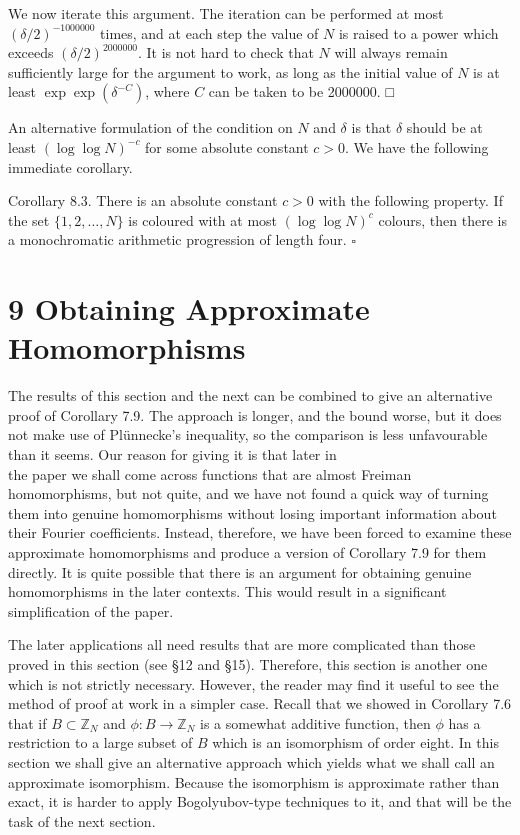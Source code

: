 \documentclass[10pt]{article}
\begin{document}
We now iterate this argument. The iteration can be performed at most $(\delta / 2)^{-1000000}$ times, and at each step the value of $N$ is raised to a power which exceeds $(\delta / 2)^{2000000}$. It is not hard to check that $N$ will always remain sufficiently large for the argument to work, as long as the initial value of $N$ is at least $\exp \exp \left(\delta^{-C}\right)$, where $C$ can be taken to be 2000000. □

An alternative formulation of the condition on $N$ and $\delta$ is that $\delta$ should be at least $(\log \log N)^{-c}$ for some absolute constant $c>0$. We have the following immediate corollary.

Corollary 8.3. There is an absolute constant $c>0$ with the following property. If the set $\{1,2, \ldots, N\}$ is coloured with at most $(\log \log N)^{c}$ colours, then there is a monochromatic arithmetic progression of length four. \(\square\)

\section*{9 Obtaining Approximate Homomorphisms}
The results of this section and the next can be combined to give an alternative proof of Corollary 7.9. The approach is longer, and the bound worse, but it does not make use of Plünnecke's inequality, so the comparison is less unfavourable than it seems. Our reason for giving it is that later in\\
the paper we shall come across functions that are almost Freiman homomorphisms, but not quite, and we have not found a quick way of turning them into genuine homomorphisms without losing important information about their Fourier coefficients. Instead, therefore, we have been forced to examine these approximate homomorphisms and produce a version of Corollary 7.9 for them directly. It is quite possible that there is an argument for obtaining genuine homomorphisms in the later contexts. This would result in a significant simplification of the paper.

The later applications all need results that are more complicated than those proved in this section (see §12 and §15). Therefore, this section is another one which is not strictly necessary. However, the reader may find it useful to see the method of proof at work in a simpler case. Recall that we showed in Corollary 7.6 that if $B \subset \mathbb{Z}_{N}$ and $\phi: B \rightarrow \mathbb{Z}_{N}$ is a somewhat additive function, then $\phi$ has a restriction to a large subset of $B$ which is an isomorphism of order eight. In this section we shall give an alternative approach which yields what we shall call an approximate isomorphism. Because the isomorphism is approximate rather than exact, it is harder to apply Bogolyubov-type techniques to it, and that will be the task of the next section.
\end{document}
